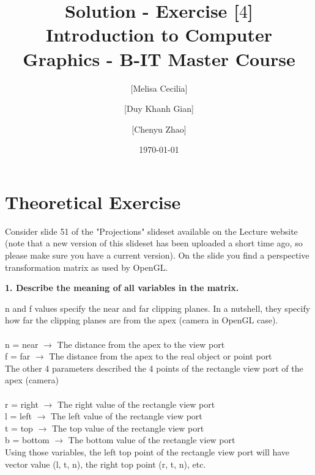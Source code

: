 \documentclass[10pt,a4paper]{article}
\begin{document}
\title{Solution - Exercise [$4$]\\
\small{Introduction to Computer Graphics - B-IT Master Course}}
\author{ [Melisa Cecilia] \and [Duy Khanh Gian] \and [Chenyu Zhao]}
\date{\today}
\maketitle

\section*{Theoretical Exercise}
Consider slide 51 of the "Projections" slideset available on the Lecture website (note that a new version of this slideset has been uploaded a short time ago, so please make sure you have a current version). On the slide you find a perspective transformation matrix as used by OpenGL.\\

\begin{flushleft}
{\bf 1. Describe the meaning of all variables in the matrix.} \\
\end{flushleft}

n and f values specify the near and far clipping planes. In a nutshell, they specify how far the clipping planes are from the apex (camera in OpenGL case). \\ \\
n = near $\rightarrow$ The distance from the apex to the view port \\
f = far $\rightarrow$ The distance from the apex to the real object or point port \\

The other 4 parameters described the 4 points of the rectangle view port of the apex (camera) \\ \\
r = right $\rightarrow$ The right value of the rectangle view port \\
l = left $\rightarrow$ The left value of the rectangle view port \\
t = top $\rightarrow$ The top value of the rectangle view port \\
b = bottom $\rightarrow$ The bottom value of the rectangle view port \\

Using those variables, the left top point of the rectangle view port will have vector value (l, t, n), the right top point (r, t, n), etc. \\
\end{document}
